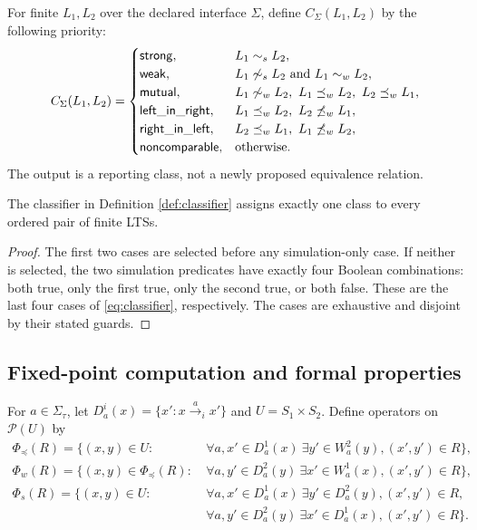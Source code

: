 \documentclass{ws-jbcb}
\numberwithin{equation}{section}
\newcommand{\TAU}{\tau}
\newcommand{\powerset}{\mathcal{P}}
\newcommand{\strongsim}{\mathrel{\sim_{s}}}
\newcommand{\weaksim}{\mathrel{\sim_{w}}}
\newcommand{\weakpre}{\mathrel{\preceq_{w}}}
\begin{document}
\begin{definition}\label{def:classifier}
For finite $L_1,L_2$ over the declared interface $\Sigma$, define
$C_{\Sigma}(L_1,L_2)$ by the following priority:
\begin{equation}\label{eq:classifier}
C_{\Sigma}(L_1,L_2)=
\begin{cases}
\mathsf{strong}, & L_1\strongsim L_2,\\
\mathsf{weak}, & L_1\not\strongsim L_2\text{ and }L_1\weaksim L_2,\\
\mathsf{mutual}, & L_1\not\weaksim L_2,\ L_1\weakpre L_2,\ L_2\weakpre L_1,\\
\mathsf{left\_in\_right}, & L_1\weakpre L_2,\ L_2\not\weakpre L_1,\\
\mathsf{right\_in\_left}, & L_2\weakpre L_1,\ L_1\not\weakpre L_2,\\
\mathsf{noncomparable}, & \text{otherwise}.
\end{cases}
\end{equation}
The output is a reporting class, not a newly proposed equivalence relation.
\end{definition}

\begin{proposition}\label{prop:classifier}
The classifier in Definition \ref{def:classifier} assigns exactly one class to
every ordered pair of finite LTSs.
\end{proposition}

\begin{proof}
The first two cases are selected before any simulation-only case. If neither is
selected, the two simulation predicates have exactly four Boolean combinations:
both true, only the first true, only the second true, or both false. These are the
last four cases of \eqref{eq:classifier}, respectively. The cases are exhaustive
and disjoint by their stated guards.
\end{proof}

\subsection{Fixed-point computation and formal properties}
\label{sec:fixed-point}

For $a\in\Sigma_{\TAU}$, let $D_a^i(x)=\{x':x\xrightarrow{a}_i x'\}$ and
$U=S_1\times S_2$. Define operators on $\powerset(U)$ by
\begin{align}
\Phi_{\preceq}(R)=\{(x,y)\in U:
 &\ \forall a,x'\in D_a^1(x)\ \exists y'\in W_a^2(y),
 (x',y')\in R\},\label{eq:sim-operator}\\
\Phi_w(R)=\{(x,y)\in\Phi_{\preceq}(R):
 &\ \forall a,y'\in D_a^2(y)\ \exists x'\in W_a^1(x),
 (x',y')\in R\},\label{eq:weak-bisim-operator}\\
\Phi_s(R)=\{(x,y)\in U:
 &\ \forall a,x'\in D_a^1(x)\ \exists y'\in D_a^2(y),
 (x',y')\in R,\nonumber\\
 &\ \forall a,y'\in D_a^2(y)\ \exists x'\in D_a^1(x),
 (x',y')\in R\}.\label{eq:strong-bisim-operator}
\end{align}
\end{document}
